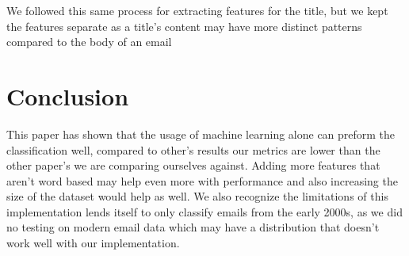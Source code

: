 \documentclass[12pt]{article}
\begin{document}
\begin{multicols}{2}
             
             We followed this same process for extracting features for the title, but
             we kept the features separate as a title's content may have more distinct
             patterns compared to the body of an email



        \section{Conclusion}
            This paper has shown that the usage of machine learning alone can preform
            the classification well, compared to other's results our metrics are lower
            than the other paper's we are comparing ourselves against. Adding more features
            that aren't word based may help even more with performance and also increasing the
            size of the dataset would help as well. We also recognize the limitations of
            this implementation lends itself to only classify emails from the early 2000s, as
            we did no testing on modern email data which may have a distribution that doesn't
            work well with our implementation.
        \nocite{*}
         
        
    \end{multicols}
\end{document}
